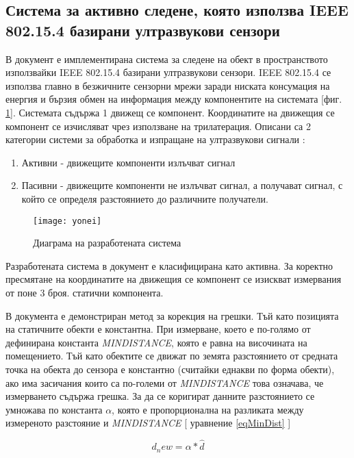 \subsection{Система за активно следене, която използва IEEE 802.15.4 базирани ултразвукови сензори}

В документ \cite{yonei} е имплементирана система за следене на обект в пространството използвайки IEEE 802.15.4 базирани ултразвукови сензори.
IEEE 802.15.4 се използва главно в безжичните сензорни мрежи заради ниската консумация на енергия и бързия обмен на информация между компонентите на системата [фиг. \ref{fig:yoneiFig}]. Системата съдържа 1 движещ се компонент. Координатите на движещия се компонент се изчисляват чрез използване на трилатерация.  Описани са 2 категории системи за обработка и изпращане на ултразвукови сигнали \cite{sysTypes}:

\begin{enumerate}
    \item Активни - движещите компоненти излъчват сигнал
    \item Пасивни - движещите компоненти не излъчват сигнал, а получават сигнал, с който се определя разстоянието до различните получатели.
\end{enumerate}

\begin{figure}
    \centering
    \texttt{[image: yonei]}
    \caption{Диаграма на разработената система}
    \label{fig:yoneiFig}
\end{figure}

Разработената система в документ \cite{yonei} е класифицирана като активна. За коректно пресмятане на координатите на движещия се компонент се изискват измервания от поне 3 броя. статични компонента. 

В документа е демонстриран метод за корекция на грешки. Тъй като позицията на статичните обекти е константна. При измерване, което е по-голямо от дефинирана константа \textit{MINDISTANCE}, която е равна на височината на помещението. Тъй като обектите се движат по земята разстоянието от средната точка на обекта до сензора е константно (считайки еднакви по форма обекти), ако има засичания които са по-големи от \textit{MINDISTANCE} това означава, че измерването съдържа грешка. За да се коригират данните разстоянието се умножава по константа $\alpha$, която е пропорционална на разликата между измереното разстояние и \textit{MINDISTANCE} [ уравнение \ref{eqMinDist} ]

\begin{equation} \label{eqMinDist}
    d_new = \alpha * \hat{d}
\end{equation}